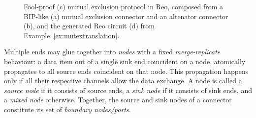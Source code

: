 \documentclass[submission,copyright,creativecommons,hidelinks]{eptcs}
\theoremstyle{plain} \newtheorem{theorem}{Theorem}
\theoremstyle{definition}
\theoremstyle{remark}
\newcommand{\ex}[1]{Example~\ref{ex:#1}}
\begin{document}
\begin{figure}[t]
{{
\label{fig:generatedmutex}}}
\caption{Fool-proof (c) mutual exclusion protocol in Reo, composed from a BIP-like (a) mutual exclusion connector and an altenator connector (b), and the generated Reo circuit (d) from \ex{mutextranslation}.}
\label{fig:reomutex}
\end{figure}

Multiple ends may glue together into \emph{nodes} with a fixed \emph{merge-replicate} behaviour: a data item out of a single sink end coincident on a node, atomically propagates to all source ends coincident on that node. This propagation happens only if all their respective channels allow the data exchange. 
A node is called a \emph{source node} if it consists of source ends, a \emph{sink node} if it consists of sink ends, and a \emph{mixed node} otherwise. 
Together, the source and sink nodes of a connector constitute its set of \emph{boundary nodes/ports}.
\end{document}
